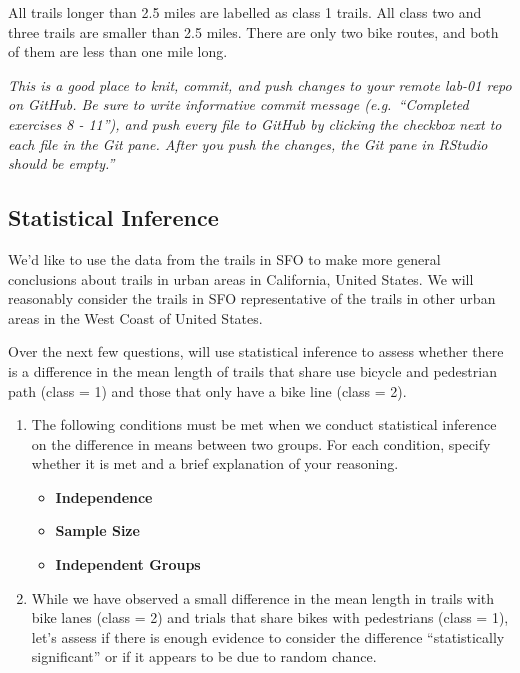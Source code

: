 \documentclass[
]{article}
\providecommand{\tightlist}{%
  \setlength{\itemsep}{0pt}\setlength{\parskip}{0pt}}
\begin{document}
All trails longer than 2.5 miles are labelled as class 1 trails. All
class two and three trails are smaller than 2.5 miles. There are only
two bike routes, and both of them are less than one mile long.

\emph{This is a good place to knit, commit, and push changes to your
remote lab-01 repo on GitHub. Be sure to write informative commit
message (e.g.~``Completed exercises 8 - 11''), and push every file to
GitHub by clicking the checkbox next to each file in the Git pane. After
you push the changes, the Git pane in RStudio should be empty.''}

\hypertarget{statistical-inference}{%
\subsection{Statistical Inference}\label{statistical-inference}}

We'd like to use the data from the trails in SFO to make more general
conclusions about trails in urban areas in California, United States. We
will reasonably consider the trails in SFO representative of the trails
in other urban areas in the West Coast of United States.

Over the next few questions, will use statistical inference to assess
whether there is a difference in the mean length of trails that share
use bicycle and pedestrian path (class = 1) and those that only have a
bike line (class = 2).

\begin{enumerate}
\def\labelenumi{\arabic{enumi}.}
\setcounter{enumi}{11}
\tightlist
\item
  The following conditions must be met when we conduct statistical
  inference on the difference in means between two groups. For each
  condition, specify whether it is met and a brief explanation of your
  reasoning.

  \begin{itemize}
  \tightlist
  \item
    \textbf{Independence}
  \item
    \textbf{Sample Size}
  \item
    \textbf{Independent Groups}
  \end{itemize}
\item
  While we have observed a small difference in the mean length in trails
  with bike lanes (class = 2) and trials that share bikes with
  pedestrians (class = 1), let's assess if there is enough evidence to
  consider the difference ``statistically significant'' or if it appears
  to be due to random chance.
\end{enumerate}
\end{document}
